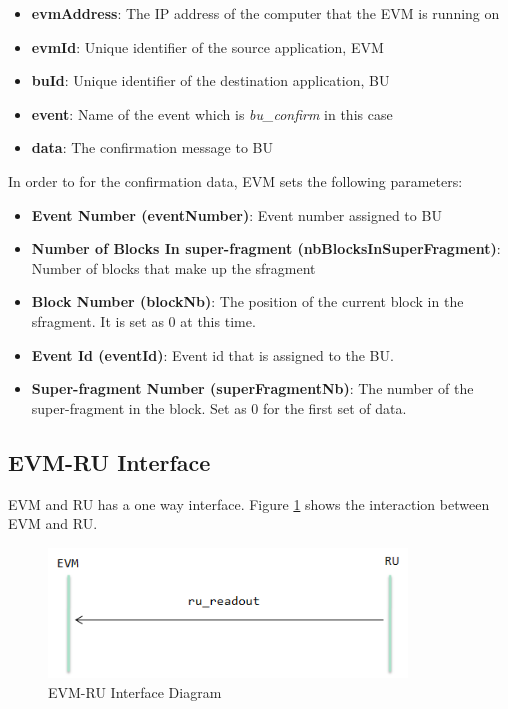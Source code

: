 \begin{itemize}
	\item \textbf{evmAddress}: The IP address of the computer that the EVM is running on
	\item \textbf{evmId}: Unique identifier of the source application, EVM
	\item \textbf{buId}: Unique identifier of the destination application, BU
	\item \textbf{event}: Name of the event which is \textit{bu\_confirm} in this case
	\item \textbf{data}: The confirmation message to BU
\end{itemize}

In order to for the confirmation data, EVM sets the following parameters:

\begin{itemize}
	\item \textbf{Event Number (eventNumber)}: Event number assigned to BU
	\item \textbf{Number of Blocks In super-fragment (nbBlocksInSuperFragment)}: Number of blocks that make up the sfragment
	\item \textbf{Block Number (blockNb)}: The position of the current block in the sfragment. It is set as $0$ at this time.
	\item \textbf{Event Id (eventId)}: Event id that is assigned to the BU.
	\item \textbf{Super-fragment Number (superFragmentNb)}: The number of the super-fragment in the block. Set as $0$ for the first set of data.
\end{itemize}


\subsection{EVM-RU Interface}

EVM and RU has a one way interface. Figure \ref{fig:evm-ru} shows the interaction between EVM and RU.

\begin{figure}
	\centering
		\includegraphics[width=0.85\textwidth]{figures/evm-ru.png}
	\caption{EVM-RU Interface Diagram}
	\label{fig:evm-ru}
\end{figure}

